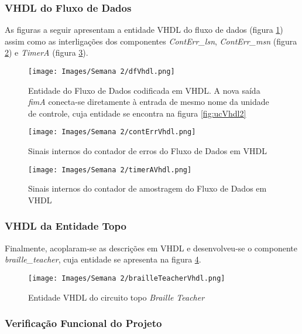\documentclass[amsmath,amssymb,floatfix]{report}
\begin{document}
\subsubsection{VHDL do Fluxo de Dados}
\label{subsubsec:dfVhdl2}

As figuras a seguir apresentam a entidade VHDL do fluxo de dados (figura \ref{fig:dfVhdl2}) assim como as interligações dos componentes \textit{ContErr\_lsn}, \textit{ContErr\_msn} (figura \ref{fig:contErrVhdl2}) e \textit{TimerA} (figura \ref{fig:timerAVhdl2}).

\begin{figure}[H]
    \centering
    \texttt{[image: Images/Semana 2/dfVhdl.png]}
    \caption{Entidade do Fluxo de Dados codificada em VHDL. A nova saída \textit{fimA} conecta-se diretamente à entrada de mesmo nome da unidade de controle, cuja entidade se encontra na figura \ref{fig:ucVhdl2}}
    \label{fig:dfVhdl2}
\end{figure}

\begin{figure}[H]
    \centering
    \texttt{[image: Images/Semana 2/contErrVhdl.png]}
    \caption{Sinais internos do contador de erros do Fluxo de Dados em VHDL}
    \label{fig:contErrVhdl2}
\end{figure}

\begin{figure}[H]
    \centering
    \texttt{[image: Images/Semana 2/timerAVhdl.png]}
    \caption{Sinais internos do contador de amostragem do Fluxo de Dados em VHDL}
    \label{fig:timerAVhdl2}
\end{figure}

\subsubsection{VHDL da Entidade Topo}
\label{subsubsec:btVhdl2}

Finalmente, acoplaram-se as descrições em VHDL e desenvolveu-se o componente \textit{braille\_teacher}, cuja entidade se apresenta na figura \ref{fig:brailleTeacherVhdl2}.

\begin{figure}[H]
    \centering
    \texttt{[image: Images/Semana 2/brailleTeacherVhdl.png]}
    \caption{Entidade VHDL do circuito topo \textit{Braille Teacher}}
    \label{fig:brailleTeacherVhdl2}
\end{figure}

\subsubsection{Verificação Funcional do Projeto}
\label{subsubsec:tbVhdl2}
\end{document}

